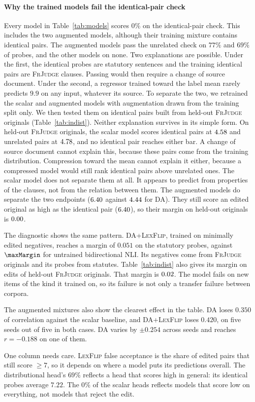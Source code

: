 \documentclass{BVP_JCLLT}
\begin{document}
{\paragraph{Why the trained models fail the identical-pair check}
Every model in Table~\ref{tab:models} scores $0\%$ on the identical-pair check.
This includes the two augmented models, although their training mixture contains
identical pairs. The augmented models pass the unrelated check on $77\%$ and
$69\%$ of probes, and the other models on none. Two explanations are possible.
Under the first, the identical probes are statutory sentences and the training
identical pairs are \textsc{FrJudge} clauses. Passing would then require a
change of source document. Under the second, a regressor trained toward the label mean
rarely predicts $9.9$ on any input, whatever its source. To separate the two, we
retrained the scalar and augmented models with augmentation drawn from the
training split only. We then tested them on identical pairs built from held-out
\textsc{FrJudge} originals (Table~\ref{tab:indist}). Neither explanation
survives in its simple form. On held-out \textsc{FrJudge} originals, the scalar
model scores identical pairs at $4.58$ and unrelated pairs at
$4.78$, and no identical pair reaches either bar. A change of source
document cannot explain this, because these pairs come from the training
distribution. Compression toward the mean cannot explain it either, because a
compressed model would still rank identical pairs above unrelated ones. The
scalar model does not separate them at all. It appears to predict from
properties of the clauses, not from the relation between them. The augmented
models do separate the two endpoints ($6.40$ against $4.44$ for
\textsc{DA}). They still score an edited original as high as the identical pair
($6.40$), so their margin on held-out originals is $0.00$.

The diagnostic shows the same pattern. \textsc{DA+LexFlip}, trained on minimally
edited negatives, reaches a margin of $0.051$ on the statutory probes, against
$\maxMargin$ for untrained bidirectional NLI. Its negatives come from
\textsc{FrJudge} originals and its probes from statutes. Table~\ref{tab:indist}
also gives its margin on edits of held-out \textsc{FrJudge} originals. That
margin is $0.02$. The model fails on new items of the kind it trained
on, so its failure is not only a transfer failure between corpora.

The augmented mixtures also show the clearest effect in the table.
\textsc{DA} loses $0.350$ of correlation against the scalar baseline, and
\textsc{DA+LexFlip} loses $0.420$, on five seeds out of five in both cases.
\textsc{DA} varies by $\pm0.254$ across seeds and reaches $r=-0.188$ on one of
them.

One column needs care. \textsc{LexFlip} false acceptance is the share of edited
pairs that still score $\geq 7$, so it depends on where a model puts its
predictions overall. The distributional head's $69\%$ reflects a head that
scores high in general: its identical probes average $7.22$. The $0\%$ of the
scalar heads reflects models that score low on everything, not models that
reject the edit.}
\end{document}
